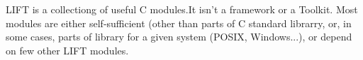 L\-I\-F\-T is a collectiong of useful C modules.\-It isn't a framework or a Toolkit. Most modules are either self-\/sufficient (other than parts of C standard librarry, or, in some cases, parts of library for a given system (P\-O\-S\-I\-X, Windows...), or depend on few other L\-I\-F\-T modules. 